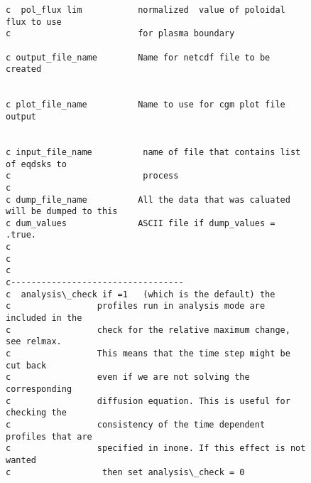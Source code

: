 \begin{figure}
{\begin{verbatim}
c  pol_flux lim           normalized  value of poloidal flux to use
c                         for plasma boundary

c output_file_name        Name for netcdf file to be created


c plot_file_name          Name to use for cgm plot file output


c input_file_name          name of file that contains list of eqdsks to 
c                          process
c
c dump_file_name          All the data that was caluated will be dumped to this
c dum_values              ASCII file if dump_values = .true.
c
c
c
c----------------------------------
c  analysis\_check if =1   (which is the default) the
c                 profiles run in analysis mode are included in the
c                 check for the relative maximum change, see relmax.
c                 This means that the time step might be cut back
c                 even if we are not solving the corresponding
c                 diffusion equation. This is useful for checking the
c                 consistency of the time dependent profiles that are 
c                 specified in inone. If this effect is not wanted
c                  then set analysis\_check = 0
\end{verbatim}
}
\end{figure}

